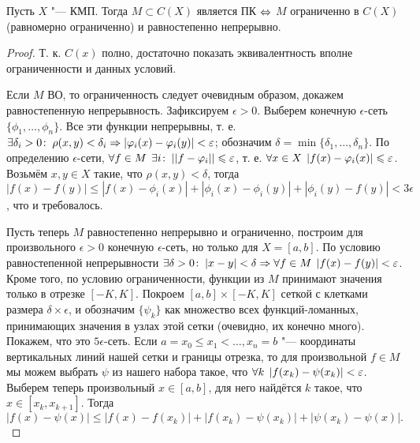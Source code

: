 \documentclass[main]{subfiles}
\begin{document}
\begin{theorem}
  Пусть \( X \) "--- КМП.
  Тогда \( M \subset C(X) \)
  является ПК \( \Leftrightarrow \)
  \( M \) ограниченно в \( C(X) \) (равномерно ограниченно)
  и равностепенно непрерывно.
\end{theorem}
\begin{proof}
  Т. к. \( C(x) \) полно, достаточно показать эквивалентность
  вполне ограниченности и данных условий.

  Если \( M \) ВО, то
  ограниченность следует очевидным образом,
  докажем равностепенную непрерывность.
  Зафиксируем \( \epsilon > 0 \).
  Выберем конечную \( \epsilon \)-сеть
  \( \{ \phi_1, \dots, \phi_n \} \).
  Все эти функции непрерывны, т. е.
  \( \exists \delta_i > 0 \colon \: \rho(x, y) < \delta_i \Rightarrow
  |\varphi_i(x) - \varphi_i(y)| < \varepsilon \);
  обозначим \( \delta = \min \{ \delta_1, \dots, \delta_n \} \).
  По определению \( \epsilon \)-сети,
  \( \forall {f \in M} \; \, \exists i \colon \: ||f - \varphi_i|| \leqslant \varepsilon \),
  т. е. \( \forall {x \in X} \; \, |f(x) - \varphi_i(x)| \leqslant \varepsilon \).
  Возьмём \( x, y \in X \) такие, что \( \rho(x, y) < \delta \),
  тогда \( |f(x) - f(y)| \le |f(x) - \phi_i(x)| +
  |\phi_i(x) - \phi_i(y)| + |\phi_i(y) - f(y)| <
  3\epsilon \), что и требовалось.

  Пусть теперь \( M \) равностепенно непрерывно и ограниченно,
  построим для произвольного \( \epsilon > 0 \) конечную \( \epsilon \)-сеть,
  но только для \( X = [a, b] \).
  По условию равностепенной непрерывности \( \exists \delta > 0 \colon \:
  |x - y| < \delta \Rightarrow \forall {f \in M} \; \, |f(x) - f(y)| < \varepsilon \).
  Кроме того, по условию ограниченности, функции из \( M \) принимают значения
  только в отрезке \( [-K, K] \).
  Покроем \( [a, b] \times [-K, K] \) сеткой с клетками размера
  \( \delta \times \epsilon \), и обозначим \( \{ \psi_k \} \)
  как множество всех функций-ломанных, принимающих значения в узлах этой сетки
  (очевидно, их конечно много). Покажем, что это \( 5\epsilon \)-сеть.
  Если \( a = x_0 \le x_1 < \dots, x_n = b \) "---
  координаты вертикальных линий нашей сетки и границы отрезка,
  то для произвольной \( f \in M \) мы можем выбрать \( \psi \) из нашего набора
  такое, что \( \forall {k} \; \, |f(x_k) - \psi(x_k)| < \varepsilon \).
  Выберем теперь произвольный \( x \in [a, b] \), для него найдётся
  \( k \) такое, что \( x \in [x_k, x_{k+1}] \). Тогда
  \[
    |f(x) - \psi(x)| \le |f(x) - f(x_k)| + |f(x_k) - \psi(x_k)| +
    |\psi(x_k) - \psi(x)|.
  \]
\end{proof}
\end{document}
